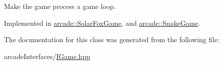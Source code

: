 Make the game process a game loop. 



Implemented in \hyperlink{classarcade_1_1_solar_fox_game_a12ff0eeb750910455e2dcc1954cdac86}{arcade\+::\+Solar\+Fox\+Game}, and \hyperlink{classarcade_1_1_snake_game_a8a04d76c02f814a01a27f394775ea2f7}{arcade\+::\+Snake\+Game}.



The documentation for this class was generated from the following file\+:\begin{DoxyCompactItemize}
\item 
arcade\+Interfaces/\hyperlink{_i_game_8hpp}{I\+Game.\+hpp}\end{DoxyCompactItemize}
